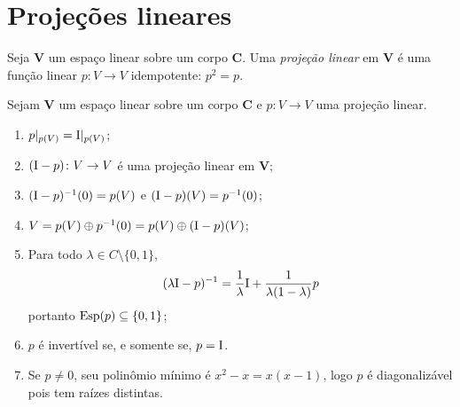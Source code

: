 \section{Projeções lineares}

\begin{definition}
Seja $\bm V$ um espaço linear sobre um corpo $\bm C$. Uma \emph{projeção linear} em $\bm V$ é uma função linear $p\colon V \to V$ idempotente: $p^2=p$.
\end{definition}

\begin{proposition}
Sejam $\bm V$ um espaço linear sobre um corpo $\bm C$ e $p\colon V \to V$ uma projeção linear.
	\begin{enumerate}
	\item $p|_{p(V)} = \mathrm{I}|_{p(V)}$;

	\item $(\mathrm{I}-p) \colon V \to V$ é uma projeção linear em $\bm V$;

	\item $(\mathrm{I}-p)^{-1}(0) = p(V)$ e $(\mathrm{I}-p)(V) = p^{-1}(0)$;

	\item $V = p(V) \oplus p^{-1}(0) = p(V) \oplus (\mathrm{I}-p)(V)$;

	\item Para todo $\lambda \in C \setminus \{0,1\}$,
		\begin{equation*}
		(\lambda\mathrm{I}-p)^{-1} = \frac{1}{\lambda}\mathrm{I} + \frac{1}{\lambda(1-\lambda)}p
		\end{equation*}
portanto $\operatorname{Esp}(p) \subseteq \{0,1\}$;

	\item $p$ é invertível se, e somente se, $p=\mathrm{I}$.

	\item Se $p \neq 0$, seu polinômio mínimo é $x^2-x = x(x-1)$, logo $p$ é diagonalizável pois tem raízes distintas.
	\end{enumerate}
\end{proposition}
